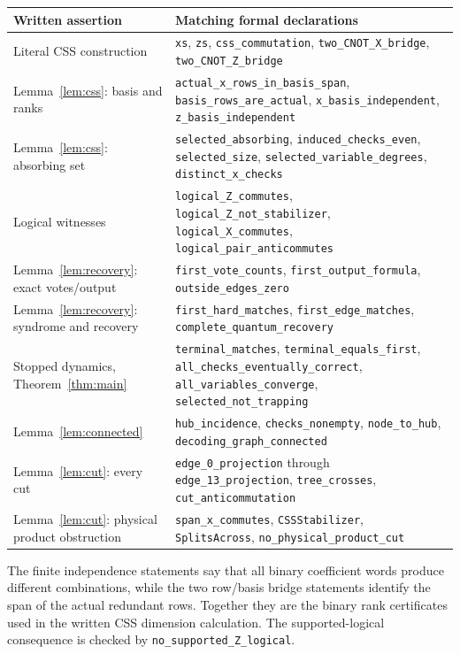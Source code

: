 \small
\renewcommand{\arraystretch}{0.9}
\begin{longtable}{p{}p{}}
\toprule Written assertion & Matching formal declarations\\\midrule\endhead
Literal CSS construction & \texttt{xs}, \texttt{zs}, \texttt{css\_commutation},
\texttt{two\_CNOT\_X\_bridge}, \texttt{two\_CNOT\_Z\_bridge}\\
Lemma~\ref{lem:css}: basis and ranks & \texttt{actual\_x\_rows\_in\_basis\_span},
\texttt{basis\_rows\_are\_actual}, \texttt{x\_basis\_independent},
\texttt{z\_basis\_independent}\\
Lemma~\ref{lem:css}: absorbing set & \texttt{selected\_absorbing},
\texttt{induced\_checks\_even}, \texttt{selected\_size},
\texttt{selected\_variable\_degrees}, \texttt{distinct\_x\_checks}\\
Logical witnesses & \texttt{logical\_Z\_commutes}, \texttt{logical\_Z\_not\_stabilizer},
\texttt{logical\_X\_commutes}, \texttt{logical\_pair\_anticommutes}\\
Lemma~\ref{lem:recovery}: exact votes/output & \texttt{first\_vote\_counts},
\texttt{first\_output\_formula}, \texttt{outside\_edges\_zero}\\
Lemma~\ref{lem:recovery}: syndrome and recovery & \texttt{first\_hard\_matches},
\texttt{first\_edge\_matches}, \texttt{complete\_quantum\_recovery}\\
Stopped dynamics, Theorem~\ref{thm:main} & \texttt{terminal\_matches},
\texttt{terminal\_equals\_first}, \texttt{all\_checks\_eventually\_correct},
\texttt{all\_variables\_converge}, \texttt{selected\_not\_trapping}\\
Lemma~\ref{lem:connected} & \texttt{hub\_incidence}, \texttt{checks\_nonempty},
\texttt{node\_to\_hub}, \texttt{decoding\_graph\_connected}\\
Lemma~\ref{lem:cut}: every cut & \texttt{edge\_0\_projection} through
\texttt{edge\_13\_projection}, \texttt{tree\_crosses}, \texttt{cut\_anticommutation}\\
Lemma~\ref{lem:cut}: physical product obstruction & \texttt{span\_x\_commutes},
\texttt{CSSStabilizer}, \texttt{SplitsAcross}, \texttt{no\_physical\_product\_cut}\\
\bottomrule
\end{longtable}
\renewcommand{\arraystretch}{1}
\normalsize
The finite independence statements say that all binary coefficient words
produce different combinations, while the two row/basis bridge statements
identify the span of the actual redundant rows. Together they are the
binary rank certificates used in the written CSS dimension calculation. The supported-logical consequence is checked by \texttt{no\_supported\_Z\_logical}.

